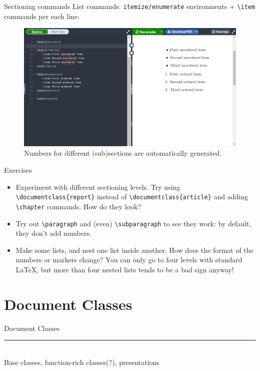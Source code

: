 \documentclass{beamer}
\begin{document}
{  \begin{frame}{Sectioning commands}
    List commands: \texttt{itemize/enumerate} environments + \texttt{\textbackslash item} commands per each line.
    \begin{figure}
      \includegraphics[width=0.9\linewidth]{day01-overleaf-06-lists.png}
      \caption{Numbers for different (sub)sections are automatically generated.}
      \label{fig:day01-overleaf-06-lists}
    \end{figure}
  \end{frame}

  \begin{frame}{Exercises}
  \begin{itemize}
    \item Experiment with different sectioning levels. Try using \texttt{\textbackslash documentclass\{report\}} instead of \texttt{\textbackslash documentclass\{article\}} and adding \texttt{\textbackslash chapter} commands. How do they look?
    \item Try out \texttt{\textbackslash paragraph} and (even) \texttt{\textbackslash subparagraph} to see they work: by default, they don’t add numbers.
    \item Make some lists, and nest one list inside another. How does the format of the numbers or markers change? You can only go to four levels with standard \LaTeX, but more than four nested lists tends to be a bad sign anyway!
  \end{itemize}
  \end{frame}

  \section{Document Classes}

  \begin{frame}[plain]
    \vfill
    \centering
    \begin{beamercolorbox}[sep=8pt,center,shadow=true,rounded=true]{Document Classes}
      \insertsectionhead\par%
      \color{davisblue}\noindent\rule{10cm}{1pt} \\
      \footnotesize{Base classes, function-rich classes(?), presentations}
    \end{beamercolorbox}
    \vfill
  \end{frame}

}
\end{document}
